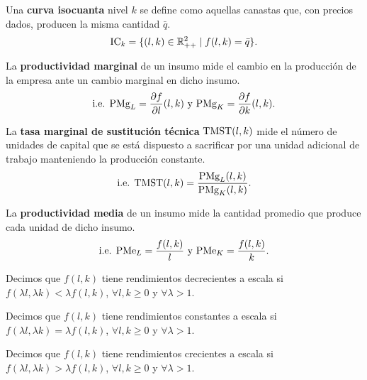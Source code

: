\documentclass[8pt,a4paper]{extarticle}
\begin{document}
\begin{multicols}{3}
\begin{boxdef}[Isocuanta]
Una \textbf{curva isocuanta} nivel $k$ se define como aquellas canastas que, con precios dados, producen la misma cantidad $\bar{q}$. \\
$$\text{\normalfont IC}_k = \{(l, k) \in \mathbb{R}^2_{++} \mid f(l, k) = \bar{q} \}.$$
\end{boxdef}

\begin{boxdef}
	La \textbf{productividad marginal} de un insumo mide el cambio en la producción de la empresa ante un cambio marginal en dicho insumo.
	\[
		\text{\normalfont i.e. PMg}_L = \frac{\partial f}{\partial l} (l, k)\ \text{y } \text{\normalfont PMg}_K = \frac{\partial f}{\partial k} (l, k)
	.\] 
\end{boxdef}

\begin{boxdef}
	La \textbf{tasa marginal de sustitución técnica} $\text{\normalfont TMST} (l, k) $ mide el número de unidades de capital que se está dispuesto a sacrificar por una unidad adicional de trabajo manteniendo la producción constante.
	\[
		\text{\normalfont i.e. TMST}(l,k) = \frac{\text{\normalfont PMg}_L (l, k)}{\text{\normalfont PMg}_K (l, k)}
	.\] 
\end{boxdef}

\begin{boxdef}
	La \textbf{productividad media} de un insumo mide la cantidad promedio que produce cada unidad de dicho insumo.
	\[
		\text{\normalfont i.e. PMe}_L = \frac{f (l, k)}{l}\ \text{y } \text{\normalfont PMe}_K = \frac{f (l, k)}{k}
	.\] 
\end{boxdef}

\begin{boxtheo}
	Decimos que $f(l, k)$ tiene rendimientos decrecientes a escala si $f(\lambda l, \lambda k) < \lambda f(l, k)$,\; $\forall l, k \ge 0$ y $\forall \lambda > 1$.
\end{boxtheo}

\begin{boxtheo}
	Decimos que $f(l, k)$ tiene rendimientos constantes a escala si $f(\lambda l, \lambda k) = \lambda f(l, k)$,\; $\forall l, k \ge 0$ y $\forall \lambda > 1$.
\end{boxtheo}

\begin{boxtheo}
	Decimos que $f(l, k)$ tiene rendimientos crecientes a escala si $f(\lambda l, \lambda k) > \lambda f(l, k)$,\; $\forall l, k \ge 0$ y $\forall \lambda > 1$.
\end{boxtheo}


\end{multicols}
\end{document}
